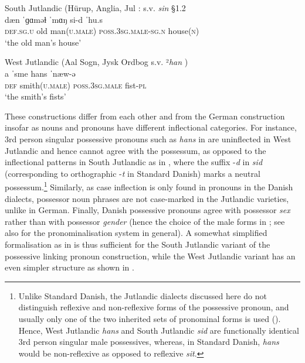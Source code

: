 \documentclass[output=paper]{langsci/langscibook}
\begin{document}
 
\ea\label{ex:hoeder:17}
	\ea\label{ex:hoeder:17a}
	South Jutlandic (Hürup, Anglia, Jul \citealt{JulNielsen.1995}: s.v. \textit{sin} \S 1.2\\
	\gll dæn{} ˈɡɑməɫ ˈmɑŋ si-d ˈhu.s\\
     \textsc{def.sg.u} old man(\textsc{u.male}){} \textsc{poss.3sg.male-sg.n} house(\textsc{n})\\
	\glt `the{} old man’s house'

	\ex\label{ex:hoeder:17b}
	West Jutlandic (Aal Sogn, Jysk Ordbog s.v. ²\textit{han} )\\
	\gll a ˈsme hans ˈnæw-ə\\
     \textsc{def} smith(\textsc{u.male}){} \textsc{poss.3sg.male} fist-\textsc{pl}\\
	\glt `the smith’s fists'
\z
\z

These constructions differ from each other and from the German construction insofar as nouns and pronouns have different inflectional categories. For instance, 3rd person singular possessive pronouns such as \textit{hans} in  are uninflected in West Jutlandic and hence cannot agree with the possessum, as opposed to the inflectional patterns in South Jutlandic as in , where the suffix -\textit{d} in \textit{sid} (corresponding to orthographic -\textit{t} in Standard Danish) marks a neutral possessum.\footnote{Unlike Standard Danish, the Jutlandic dialects discussed here do not distinguish reflexive and non-reflexive forms of the possessive pronoun, and usually only one of the two inherited sets of pronominal forms is used (\citealt{JulNielsen.1986}). Hence, West Jutlandic \textit{hans} and South Jutlandic \textit{sid} are functionally identical 3rd person singular male possessives, whereas, in Standard Danish, \textit{hans} would be non-reflexive as opposed to reflexive \textit{sit}.}\textsuperscript{} Similarly, as case inflection is only found in pronouns in the Danish dialects, possessor noun phrases are not case-marked in the Jutlandic varieties, unlike in German. Finally, Danish possessive pronouns agree with possessor \textit{sex} rather than with possessor \textit{gender} (hence the choice of the male forms in ; see also  for the pronominalisation system in general). A somewhat simplified formalisation as in  is thus sufficient{} for the South Jutlandic variant of the possessive linking pronoun construction, while the West Jutlandic variant has an even simpler structure as shown in .
\end{document}
